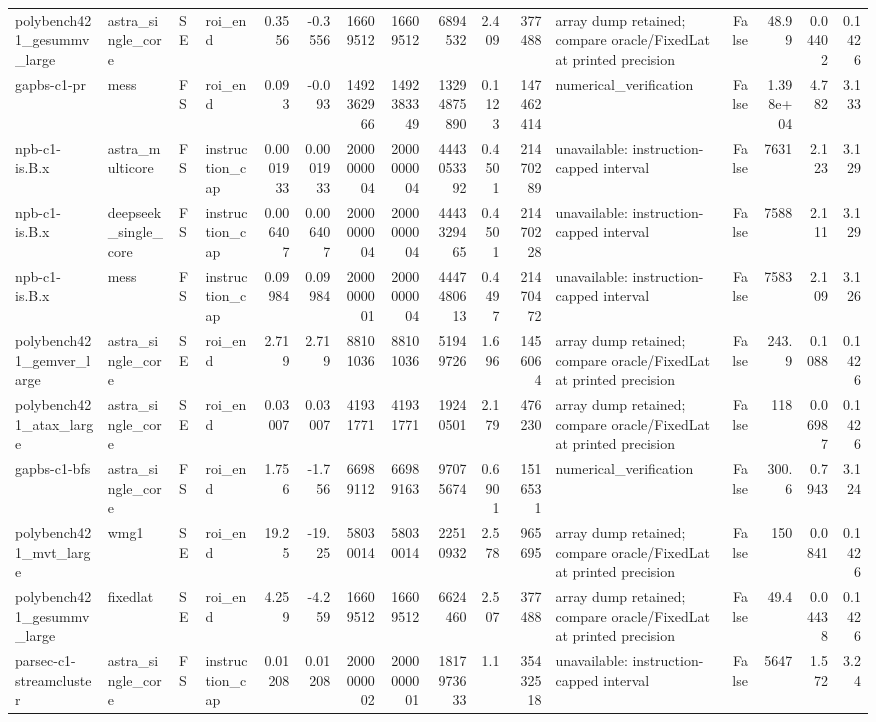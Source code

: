 \begin{tabular}{llllrrrrrrrlrrrr}
polybench421\_gesummv\_large & astra\_single\_core & SE & roi\_end & 0.3556 & -0.3556 & 16609512 & 16609512 & 6894532 & 2.409 & 377488 & array dump retained; compare oracle/FixedLat at printed precision & False & 48.99 & 0.04402 & 0.1426 \\
gapbs-c1-pr & mess & FS & roi\_end & 0.093 & -0.093 & 1492362966 & 1492383349 & 13294875890 & 0.1123 & 147462414 & numerical\_verification & False & 1.398e+04 & 4.782 & 3.133 \\
npb-c1-is.B.x & astra\_multicore & FS & instruction\_cap & 0.0001933 & 0.0001933 & 2000000004 & 2000000004 & 4443053392 & 0.4501 & 21470289 & unavailable: instruction-capped interval & False & 7631 & 2.123 & 3.129 \\
npb-c1-is.B.x & deepseek\_single\_core & FS & instruction\_cap & 0.006407 & 0.006407 & 2000000004 & 2000000004 & 4443329465 & 0.4501 & 21470228 & unavailable: instruction-capped interval & False & 7588 & 2.111 & 3.129 \\
npb-c1-is.B.x & mess & FS & instruction\_cap & 0.09984 & 0.09984 & 2000000001 & 2000000004 & 4447480613 & 0.4497 & 21470472 & unavailable: instruction-capped interval & False & 7583 & 2.109 & 3.126 \\
polybench421\_gemver\_large & astra\_single\_core & SE & roi\_end & 2.719 & 2.719 & 88101036 & 88101036 & 51949726 & 1.696 & 1456064 & array dump retained; compare oracle/FixedLat at printed precision & False & 243.9 & 0.1088 & 0.1426 \\
polybench421\_atax\_large & astra\_single\_core & SE & roi\_end & 0.03007 & 0.03007 & 41931771 & 41931771 & 19240501 & 2.179 & 476230 & array dump retained; compare oracle/FixedLat at printed precision & False & 118 & 0.06987 & 0.1426 \\
gapbs-c1-bfs & astra\_single\_core & FS & roi\_end & 1.756 & -1.756 & 66989112 & 66989163 & 97075674 & 0.6901 & 1516531 & numerical\_verification & False & 300.6 & 0.7943 & 3.124 \\
polybench421\_mvt\_large & wmg1 & SE & roi\_end & 19.25 & -19.25 & 58030014 & 58030014 & 22510932 & 2.578 & 965695 & array dump retained; compare oracle/FixedLat at printed precision & False & 150 & 0.0841 & 0.1426 \\
polybench421\_gesummv\_large & fixedlat & SE & roi\_end & 4.259 & -4.259 & 16609512 & 16609512 & 6624460 & 2.507 & 377488 & array dump retained; compare oracle/FixedLat at printed precision & False & 49.4 & 0.04438 & 0.1426 \\
parsec-c1-streamcluster & astra\_single\_core & FS & instruction\_cap & 0.01208 & 0.01208 & 2000000002 & 2000000001 & 1817973633 & 1.1 & 35432518 & unavailable: instruction-capped interval & False & 5647 & 1.572 & 3.24 \\

\end{tabular}
